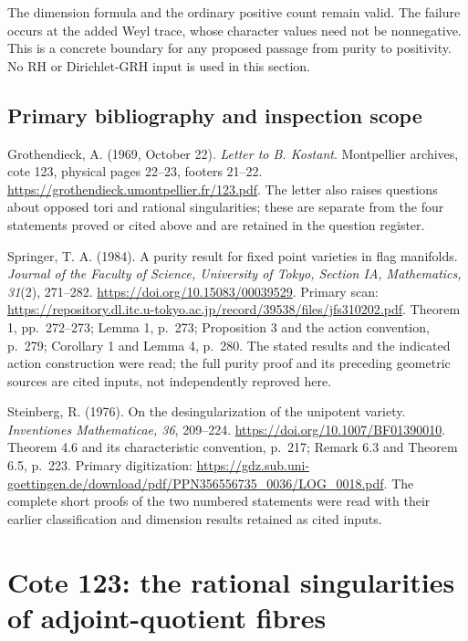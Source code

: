 \documentclass[11pt,a4paper]{article}
\theoremstyle{definition}\newtheorem{definition}[theorem]{Definition}
\theoremstyle{remark}\newtheorem{remark}[theorem]{Remark}
\begin{document}
The dimension formula and the ordinary positive count remain
valid. The failure occurs at the added Weyl trace, whose
character values need not be nonnegative. This is a concrete
boundary for any proposed passage from purity to positivity.
No RH or Dirichlet-GRH input is used in this section.

\subsection{Primary bibliography and inspection scope}
Grothendieck, A. (1969, October 22). \emph{Letter to B. Kostant}.
Montpellier archives, cote 123, physical pages 22--23,
footers 21--22. \url{https://grothendieck.umontpellier.fr/123.pdf}.
The letter also raises questions about opposed tori and rational
singularities; these are separate from the four statements proved
or cited above and are retained in the question register.

Springer, T. A. (1984). A purity result for fixed point varieties
in flag manifolds. \emph{Journal of the Faculty of Science,
University of Tokyo, Section IA, Mathematics, 31}(2), 271--282.
\url{https://doi.org/10.15083/00039529}.
Primary scan: \url{https://repository.dl.itc.u-tokyo.ac.jp/record/39538/files/jfs310202.pdf}.
Theorem 1, pp.~272--273; Lemma 1, p.~273; Proposition 3 and
the action convention, p.~279; Corollary 1 and Lemma 4, p.~280.
The stated results and the indicated action construction were read;
the full purity proof and its preceding geometric sources are
cited inputs, not independently reproved here.

Steinberg, R. (1976). On the desingularization of the unipotent
variety. \emph{Inventiones Mathematicae, 36}, 209--224.
\url{https://doi.org/10.1007/BF01390010}.
Theorem 4.6 and its characteristic convention, p.~217;
Remark 6.3 and Theorem 6.5, p.~223. Primary digitization:
\url{https://gdz.sub.uni-goettingen.de/download/pdf/PPN356556735_0036/LOG_0018.pdf}.
The complete short proofs of the two numbered statements were
read with their earlier classification and dimension results
retained as cited inputs.


\section{Cote 123: the rational singularities of adjoint-quotient fibres}
\label{sec:SM-cote123-rational}
\end{document}
